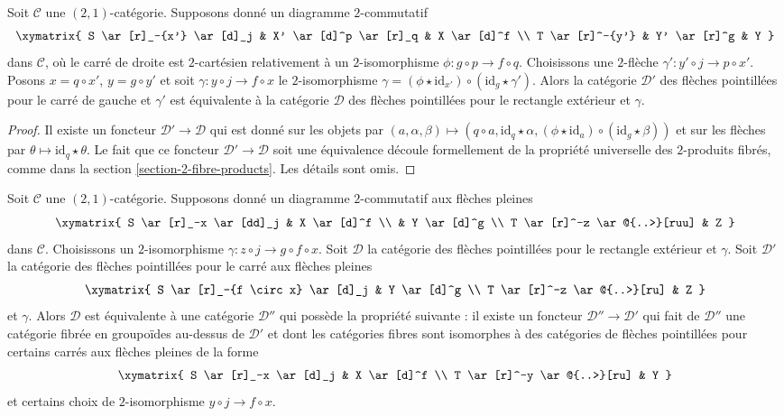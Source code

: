 \begin{lemma}
\label{lemma-cat-dotted-arrows-base-change}
Soit $\mathcal{C}$ une $(2,1)$-catégorie. Supposons donné un diagramme
$2$-commutatif
$$
\xymatrix{
S \ar[r]_-{x'} \ar[d]_j &
X' \ar[d]^p \ar[r]_q &
X \ar[d]^f \\
T \ar[r]^-{y'} &
Y' \ar[r]^g &
Y
}
$$
dans $\mathcal{C}$, où le carré de droite est $2$-cartésien
relativement à un $2$-isomorphisme $\phi \colon g \circ p \to f \circ q$.
Choisissons une $2$-flèche
$\gamma' : y' \circ j \to p \circ x'$. Posons
$x = q \circ x'$, $y = g \circ y'$ et soit
$\gamma : y \circ j \to f \circ x$ le $2$-isomorphisme
$\gamma = (\phi \star \text{id}_{x'}) \circ (\text{id}_g \star \gamma')$.
Alors la catégorie $\mathcal{D}'$ des flèches pointillées
pour le carré de gauche et $\gamma'$ est équivalente à la catégorie
$\mathcal{D}$ des flèches pointillées
pour le rectangle extérieur et $\gamma$.
\end{lemma}

\begin{proof}
Il existe un foncteur $\mathcal{D}' \to \mathcal{D}$ qui est donné sur les
objets par $(a, \alpha, \beta) \mapsto (q \circ a, \text{id}_q \star \alpha,
(\phi \star \text{id}_a) \circ (\text{id}_g \star \beta))$
et sur les flèches par $\theta \mapsto \text{id}_q \star \theta$.
Le fait que ce foncteur $\mathcal{D}' \to \mathcal{D}$ soit une équivalence
découle formellement de la propriété universelle des $2$-produits fibrés,
comme dans la section \ref{section-2-fibre-products}. Les détails sont omis.
\end{proof}

\begin{lemma}
\label{lemma-cat-dotted-arrows-composition}
Soit $\mathcal{C}$ une $(2,1)$-catégorie. Supposons donné un diagramme
$2$-commutatif aux flèches pleines
$$
\xymatrix{
S \ar[r]_-x \ar[dd]_j & X \ar[d]^f \\
& Y \ar[d]^g \\
T \ar[r]^-z \ar@{..>}[ruu] & Z
}
$$
dans $\mathcal{C}$.
Choisissons un $2$-isomorphisme
$\gamma \colon z \circ j \to g \circ f \circ x$.
Soit $\mathcal{D}$ la catégorie des flèches pointillées pour
le rectangle extérieur et $\gamma$. Soit $\mathcal{D}'$
la catégorie des flèches pointillées pour le carré aux flèches pleines
$$
\xymatrix{
S \ar[r]_-{f \circ x} \ar[d]_j & Y \ar[d]^g \\
T \ar[r]^-z \ar@{..>}[ru] & Z
}
$$
et $\gamma$. Alors $\mathcal{D}$ est équivalente à
une catégorie $\mathcal{D}''$ qui possède la propriété suivante :
il existe un foncteur $\mathcal{D}'' \to \mathcal{D}'$ qui fait de
$\mathcal{D}''$ une catégorie fibrée en groupoïdes au-dessus de
$\mathcal{D}'$ et dont les catégories fibres sont isomorphes à des catégories
de flèches pointillées pour certains carrés aux flèches pleines de la forme
$$
\xymatrix{
S \ar[r]_-x \ar[d]_j & X \ar[d]^f \\
T \ar[r]^-y \ar@{..>}[ru] & Y
}
$$
et certains choix de $2$-isomorphisme $y \circ j \to f \circ x$.
\end{lemma}

